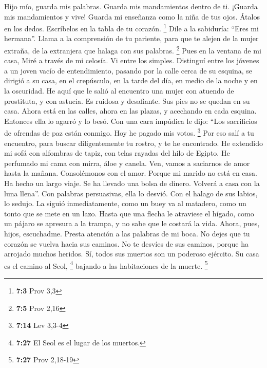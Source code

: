 \begin{paracol}{2}
 Hijo mío, guarda mis palabras. Guarda mis mandamientos
dentro de ti.  ¡Guarda mis mandamientos y vive! Guarda mi
enseñanza como la niña de tus ojos.  Átalos en los dedos.
Escríbelos en la tabla de tu corazón. \footnote{\textbf{7:3} Prov 3,3}
 Dile a la sabiduría: ``Eres mi hermana''. Llama a la
comprensión de tu pariente,  para que te alejen de la
mujer extraña, de la extranjera que halaga con sus palabras. \footnote{\textbf{7:5}
  Prov 2,16}  Pues en la ventana de mi casa, Miré a través
de mi celosía.  Vi entre los simples. Distinguí entre los
jóvenes a un joven vacío de entendimiento,  pasando por la
calle cerca de su esquina, se dirigió a su casa,  en el
crepúsculo, en la tarde del día, en medio de la noche y en la oscuridad.
 He aquí que le salió al encuentro una mujer con atuendo
de prostituta, y con astucia.  Es ruidosa y desafiante.
Sus pies no se quedan en su casa.  Ahora está en las
calles, ahora en las plazas, y acechando en cada esquina.
 Entonces ella lo agarró y lo besó. Con una cara impúdica
le dijo:  ``Los sacrificios de ofrendas de paz están
conmigo. Hoy he pagado mis votos. \footnote{\textbf{7:14} Lev 3,3-4}
 Por eso salí a tu encuentro, para buscar diligentemente
tu rostro, y te he encontrado.  He extendido mi sofá con
alfombras de tapiz, con telas rayadas del hilo de Egipto.
 He perfumado mi cama con mirra, áloe y canela.
 Ven, vamos a saciarnos de amor hasta la mañana.
Consolémonos con el amor.  Porque mi marido no está en
casa. Ha hecho un largo viaje.  Se ha llevado una bolsa
de dinero. Volverá a casa con la luna llena''.  Con
palabras persuasivas, ella lo desvió. Con el halago de sus labios, lo
sedujo.  La siguió inmediatamente, como un buey va al
matadero, como un tonto que se mete en un lazo.  Hasta
que una flecha le atraviese el hígado, como un pájaro se apresura a la
trampa, y no sabe que le costará la vida.  Ahora, pues,
hijos, escuchadme. Presta atención a las palabras de mi boca.
 No dejes que tu corazón se vuelva hacia sus caminos. No
te desvíes de sus caminos,  porque ha arrojado muchos
heridos. Sí, todos sus muertos son un poderoso ejército. 
Su casa es el camino al Seol, \footnote{\textbf{7:27} El Seol es el
  lugar de los muertos.} bajando a las habitaciones de la muerte.
\footnote{\textbf{7:27} Prov 2,18-19}


\end{paracol}
